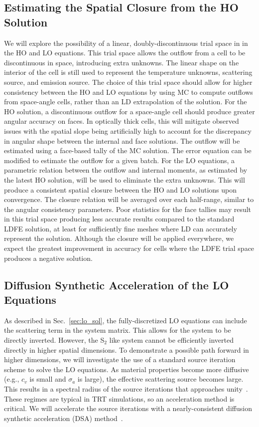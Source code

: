 \documentclass[11pt]{article}
\begin{document}
\subsection{Estimating the Spatial Closure from the HO Solution}

We will explore the possibility of a linear, doubly-discontinuous trial space in
in the HO and LO equations. This trial space allows
the outflow from a cell to be discontinuous in space, introducing extra unknowns. The
linear shape on the interior of the cell is still used to represent the temperature
unknowns, scattering source, and emission source.  The choice of this 
trial space should allow for higher consistency between the HO and LO
equations by using MC to compute outflows from space-angle cells, rather than an LD
extrapolation of the solution.    For the HO solution, a discontinuous outflow for a space-angle cell should produce greater
angular accuracy on faces.  In optically thick cells, this will mitigate observed issues with the spatial slope being
artificially high to account for the discrepancy in angular shape between the
internal and face solutions. The outflow will be estimated using a
face-based tally of the MC solution.  The error equation can be modified to estimate the outflow for a given batch. 
For the LO equations, a parametric relation between the outflow and internal moments, as
estimated by the latest HO solution,
will be used to eliminate the extra  unknowns.  This will produce a consistent spatial closure between the HO and LO
solutions upon convergence. The closure relation will be averaged
over each half-range, similar to the angular consistency parameters.   Poor statistics for the face tallies may result in this trial space producing less
accurate results compared to the standard LDFE solution, at least for sufficiently fine meshes where LD
can accurately represent the solution.  Although the closure will be applied everywhere,
we expect the greatest improvement in accuracy for cells where the LDFE trial space
produces a negative solution.

\subsection{Diffusion Synthetic Acceleration of the LO Equations}

As described in Sec.~\ref{sec:lo_sol}, the fully-discretized LO equations can include
the scattering term in the system matrix.  This allows for the system to be directly
inverted.
However, the S$_2$ like system cannot be efficiently inverted
directly in higher spatial dimensions.  To demonstrate a possible path forward in
higher dimensions, we will investigate the use of a standard
source iteration scheme to solve the LO equations.  As
material properties become more diffusive (e.g., $c_v$ is small and $\sigma_a$ is
large), the effective scattering source becomes large.  This results in a spectral radius of the source iterations that approaches
unity~\cite{morel_newton}.  These regimes are typical in TRT simulations, so an
acceleration method is critical.  We will accelerate the source iterations with a nearly-consistent diffusion synthetic acceleration
(DSA) method~\cite{wla,wla_thesis}.
\end{document}

